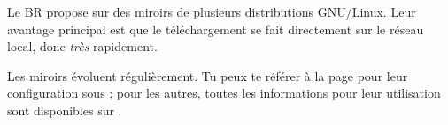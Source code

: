 Le BR propose sur  des miroirs de plusieurs distributions GNU/Linux. Leur avantage principal est que le téléchargement se fait directement sur le réseau local, donc \emph{très} rapidement.
% 

Les miroirs évoluent régulièrement. Tu peux te référer à la page \pageref{ubuntu_mirror} pour leur configuration sous  ;
pour les autres, toutes les informations pour leur utilisation sont disponibles sur .

